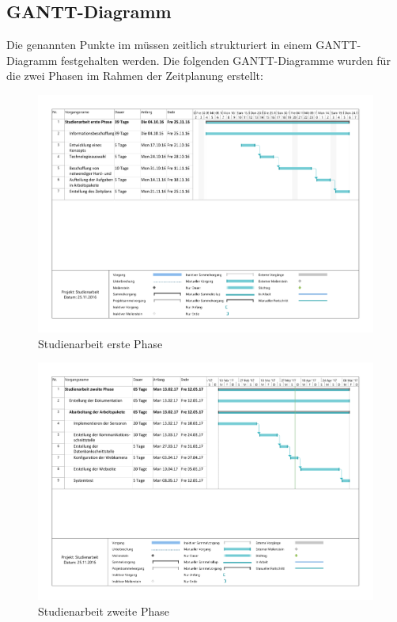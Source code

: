 \subsection{GANTT-Diagramm}
Die genannten Punkte im  müssen zeitlich strukturiert in einem GANTT-Diagramm festgehalten werden.
Die folgenden GANTT-Diagramme wurden für die zwei Phasen im Rahmen der Zeitplanung erstellt:
\begin{landscape}
	\begin{figure}[htb]
		\includegraphics[width=\linewidth, height=.9\textheight]{Bilder/GANTT/Studienarbeit_erste_Phase.pdf}
		\caption[GANTT-Diagramm: Studienarbeit erste Phase]{Studienarbeit erste Phase}
		\label{fig:Studienarbeit_erste_Phase}
	\end{figure}
\end{landscape}
\begin{landscape}
	\begin{figure}[htb]
		\includegraphics[width=\linewidth, height=.9\textheight]{Bilder/GANTT/Studienarbeit_zweite_Phase.pdf}
		\caption[GANTT-Diagramm: Studienarbeit zweite Phase]{Studienarbeit zweite Phase}
		\label{fig:Studienarbeit_zweite_Phase}
	\end{figure}
\end{landscape}

